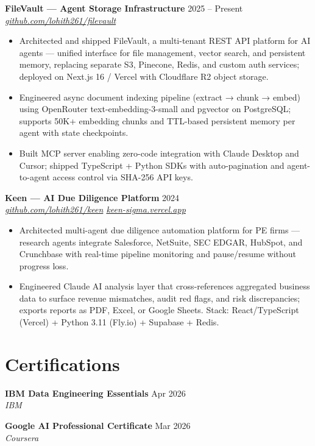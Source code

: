 \documentclass[10pt,letterpaper]{article}
\newcommand{\entry}[3]{%
  \vspace{3pt}\textbf{#1} \hfill #3 \\
  \textit{\small #2}\vspace{1pt}}
\begin{document}
\entry{FileVault --- Agent Storage Infrastructure}{\href{https://github.com/lohith261/filevault}{github.com/lohith261/filevault}}{2025 -- Present}
\begin{itemize}
  \item Architected and shipped FileVault, a multi-tenant REST API platform for AI agents --- unified interface for file management, vector search, and persistent memory, replacing separate S3, Pinecone, Redis, and custom auth services; deployed on Next.js 16 / Vercel with Cloudflare R2 object storage.
  \item Engineered async document indexing pipeline (extract → chunk → embed) using OpenRouter text-embedding-3-small and pgvector on PostgreSQL; supports 50K+ embedding chunks and TTL-based persistent memory per agent with state checkpoints.
  \item Built MCP server enabling zero-code integration with Claude Desktop and Cursor; shipped TypeScript + Python SDKs with auto-pagination and agent-to-agent access control via SHA-256 API keys.
\end{itemize}

\entry{Keen --- AI Due Diligence Platform}{\href{https://github.com/lohith261/keen}{github.com/lohith261/keen} \quad\textbullet\quad \href{https://keen-sigma.vercel.app/}{keen-sigma.vercel.app}}{2024}
\begin{itemize}
  \item Architected multi-agent due diligence automation platform for PE firms --- research agents integrate Salesforce, NetSuite, SEC EDGAR, HubSpot, and Crunchbase with real-time pipeline monitoring and pause/resume without progress loss.
  \item Engineered Claude AI analysis layer that cross-references aggregated business data to surface revenue mismatches, audit red flags, and risk discrepancies; exports reports as PDF, Excel, or Google Sheets. Stack: React/TypeScript (Vercel) + Python 3.11 (Fly.io) + Supabase + Redis.
\end{itemize}

\section{Certifications}

\textbf{IBM Data Engineering Essentials} \hfill Apr 2026 \\
\textit{IBM}

\textbf{Google AI Professional Certificate} \hfill Mar 2026 \\
\textit{Coursera}
\end{document}
